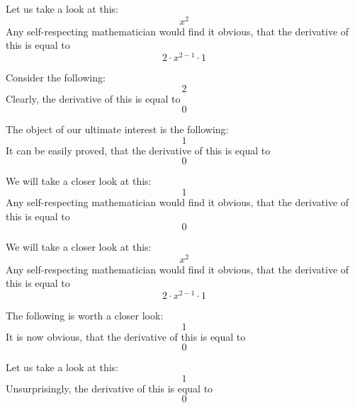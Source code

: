 \documentclass{article}
\begin{document}
Let us take a look at this:
\begin{equation}
x ^{2 } 
\end{equation}
Any self-respecting mathematician would find it obvious, that the derivative of this is equal to
\begin{equation}
2 \cdot x ^{2 - 1 } \cdot 1 
\end{equation}

Consider the following:
\begin{equation}
2 
\end{equation}
Clearly, the derivative of this is equal to
\begin{equation}
0 
\end{equation}

The object of our ultimate interest is the following:
\begin{equation}
1 
\end{equation}
It can be easily proved, that the derivative of this is equal to
\begin{equation}
0 
\end{equation}

We will take a closer look at this:
\begin{equation}
1 
\end{equation}
Any self-respecting mathematician would find it obvious, that the derivative of this is equal to
\begin{equation}
0 
\end{equation}

We will take a closer look at this:
\begin{equation}
x ^{2 } 
\end{equation}
Any self-respecting mathematician would find it obvious, that the derivative of this is equal to
\begin{equation}
2 \cdot x ^{2 - 1 } \cdot 1 
\end{equation}

The following is worth a closer look:
\begin{equation}
1 
\end{equation}
It is now obvious, that the derivative of this is equal to
\begin{equation}
0 
\end{equation}

Let us take a look at this:
\begin{equation}
1 
\end{equation}
Unsurprisingly, the derivative of this is equal to
\begin{equation}
0 
\end{equation}
\end{document}
